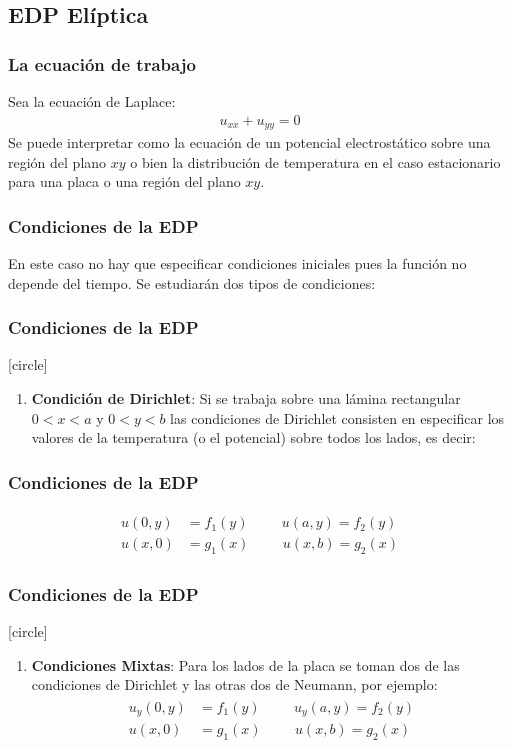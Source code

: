 \subsection{EDP Elíptica}
\begin{frame}
\frametitle{La ecuación de trabajo}
Sea la ecuación de Laplace:
\begin{align*}
u_{xx} + u_{yy} = 0
\end{align*}
Se puede interpretar como la ecuación de un potencial electrostático sobre una región del plano $xy$ o bien la distribución de temperatura en el caso estacionario para una placa o una región del plano $xy$.
\end{frame}
\begin{frame}
\frametitle{Condiciones de la EDP}
En este caso no hay que especificar condiciones iniciales pues la función no depende del tiempo. Se estudiarán dos tipos de condiciones:
\end{frame}
\begin{frame}
\frametitle{Condiciones de la EDP}
[circle]
\begin{enumerate}
\item \textbf{Condición de Dirichlet}: Si se trabaja sobre una lámina rectangular $0 < x < a$ y $0 < y < b$ las condiciones de Dirichlet consisten en especificar los valores de la temperatura (o el potencial) sobre todos los lados, es decir:
\seti
\end{enumerate}
\end{frame}
\begin{frame}
\frametitle{Condiciones de la EDP}
\begin{align}
\begin{aligned}
u(0, y) &= f_{1}(y) \hspace{1cm} u(a, y) = f_{2}(y) \\
u(x, 0) &= g_{1}(x) \hspace{1cm} u(x, b) = g_{2}(x)
\end{aligned}
\label{eq:ecuacion_06_02_05}
\end{align}
\end{frame}
\begin{frame}
\frametitle{Condiciones de la EDP}
[circle]
\begin{enumerate}
\conti    
\item \textbf{Condiciones Mixtas}: Para los lados de la placa se toman dos de las condiciones de Dirichlet y las otras dos de Neumann, por ejemplo:
\begin{align}
\begin{aligned}
u_{y}(0, y) &= f_{1}(y) \hspace{1cm} u_{y}(a, y) = f_{2}(y) \\
u(x, 0) &= g_{1}(x) \hspace{1cm} u(x, b) = g_{2}(x)
\end{aligned}
\label{eq:ecuacion_06_01_06}
\end{align}
\end{enumerate}
\end{frame}
